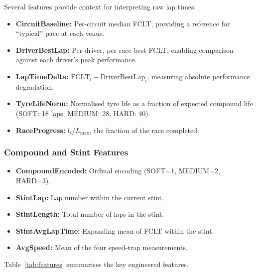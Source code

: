 \documentclass[journal,twoside]{IEEEtran}
\begin{document}
Several features provide context for interpreting raw lap times:

\begin{itemize}[noitemsep]
  \item \textbf{CircuitBaseline:} Per-circuit median FCLT, providing a
        reference for ``typical'' pace at each venue.
  \item \textbf{DriverBestLap:} Per-driver, per-race best FCLT,
        enabling comparison against each driver's peak performance.
  \item \textbf{LapTimeDelta:} $\text{FCLT}_i - \text{DriverBestLap}_i$,
        measuring absolute performance degradation.
  \item \textbf{TyreLifeNorm:} Normalised tyre life as a fraction of
        expected compound life (SOFT: 18 laps, MEDIUM: 28, HARD: 40).
  \item \textbf{RaceProgress:} $l_i / L_{\max}$, the fraction of the
        race completed.
\end{itemize}

\subsubsection{Compound and Stint Features}

\begin{itemize}[noitemsep]
  \item \textbf{CompoundEncoded:} Ordinal encoding (SOFT=1, MEDIUM=2,
        HARD=3).
  \item \textbf{StintLap:} Lap number within the current stint.
  \item \textbf{StintLength:} Total number of laps in the stint.
  \item \textbf{StintAvgLapTime:} Expanding mean of FCLT within the
        stint.
  \item \textbf{AvgSpeed:} Mean of the four speed-trap measurements.
\end{itemize}

Table~\ref{tab:features} summarises the key engineered features.
\end{document}
